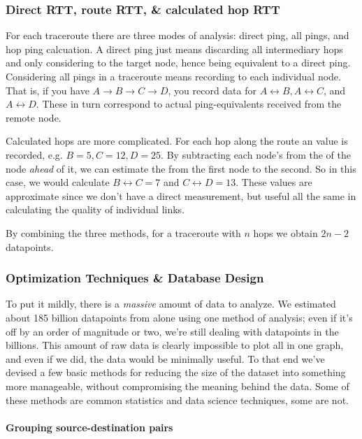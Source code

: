 \subsubsection{Direct RTT, route RTT, \& calculated hop RTT}

For each traceroute there are three modes of analysis: direct ping, all pings, and hop ping calcuation. A direct ping just means discarding all intermediary hops and only considering \rtt to the target node, hence being equivalent to a direct ping. Considering all pings in a traceroute means recording \rtt to each individual node. That is, if you have $A\rightarrow B\rightarrow C\rightarrow D$, you record data for $A\leftrightarrow B, A\leftrightarrow C$, and $A\leftrightarrow D$. These in turn correspond to actual ping-equivalents received from the remote node.

Calculated hops are more complicated. For each hop along the route an \rtt value is recorded, e.g. $B=5, C=12, D=25$. By subtracting each node's \rtt from the \rtt of the node \textit{ahead} of it, we can estimate the \rtt from the first node to the second. So in this case, we would calculate $B\leftrightarrow C=7$ and $C\leftrightarrow D=13$. These values are approximate since we don't have a direct measurement, but useful all the same in calculating the quality of individual links. 

By combining the three methods, for a traceroute with $n$ hops we obtain $2n-2$ datapoints. 

\label{sec:optimization}\subsubsection{Optimization Techniques \& Database Design}

To put it mildly, there is a \textit{massive} amount of data to analyze. We estimated about 185 billion datapoints from \caida alone using one method of analysis; even if it's off by an order of magnitude or two, we're still dealing with datapoints in the billions. This amount of raw data is clearly impossible to plot all in one graph, and even if we did, the data would be minimally useful. To that end we've devised a few basic methods for reducing the size of the dataset into something more manageable, without compromising the meaning behind the data. Some of these methods are common statistics and data science techniques, some are not.

\paragraph{Grouping source-destination pairs}


